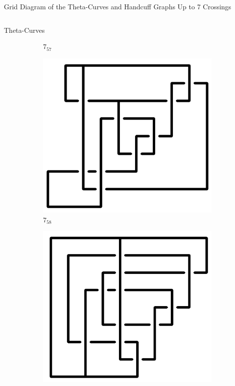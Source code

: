 \documentclass[final]{beamer}
\begin{document}
\begin{frame}[t]
\begin{alertblock}{Grid Diagram of the Theta-Curves and Handcuff Graphs Up to 7 Crossings}
\begin{columns}[t]
\begin{column}{0.5\textwidth}
\begin{alertblock}{Theta-Curves}
\begin{figure}
\begin{subfigure}{0.075\textwidth}
    \caption{$7_{57}$} 
    \end{subfigure}
    \begin{subfigure}{0.075\textwidth}
    \includegraphics[width=\columnwidth]{../Midterm_Poster/grid_diagram/theta_7_58.png}
    \caption{$7_{58}$} 
    \end{subfigure}
    \begin{subfigure}{0.075\textwidth}
    \includegraphics[width=\columnwidth]{../Midterm_Poster/grid_diagram/theta_7_59.png}

\end{subfigure}
\end{figure}
\end{alertblock}
\end{column}
\end{columns}
\end{alertblock}
\end{frame}
\end{document}
